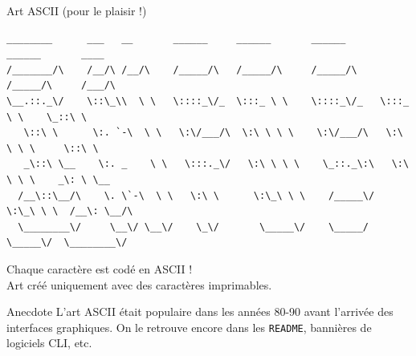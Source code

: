 \documentclass[aspectratio=1610]{beamer}
\begin{document}
\begin{frame}[fragile]{Art ASCII (pour le plaisir !)}

  \begin{lstlisting}[basicstyle=\tiny\ttfamily]
 ________      ___   __       ______     ______       ______      ______       ____        
/_______/\    /__/\ /__/\    /_____/\   /_____/\     /_____/\    /_____/\     /___/\       
\__.::._\/    \::\_\\  \ \   \::::_\/_  \:::_ \ \    \::::_\/_   \:::_ \ \    \_::\ \      
   \::\ \      \:. `-\  \ \   \:\/___/\  \:\ \ \ \    \:\/___/\   \:\ \ \ \     \::\ \     
   _\::\ \__    \:. _    \ \   \:::._\/   \:\ \ \ \    \_::._\:\   \:\ \ \ \    _\: \ \__  
  /__\::\__/\    \. \`-\  \ \   \:\ \      \:\_\ \ \    /_____\/    \:\_\ \ \  /__\: \__/\ 
  \________\/     \__\/ \__\/    \_\/       \_____\/    \_____/      \_____\/  \________\/ 
  \end{lstlisting}

  \vspace{0.3cm}

  \begin{center}
    Chaque caractère est codé en ASCII ! \\
    Art créé uniquement avec des caractères imprimables.
  \end{center}

  \vspace{0.5cm}

  \begin{exampleblock}{Anecdote}
    L'art ASCII était populaire dans les années 80-90 avant l'arrivée des interfaces graphiques.
    On le retrouve encore dans les \texttt{README}, bannières de logiciels CLI, etc.
  \end{exampleblock}

\end{frame}
\end{document}
